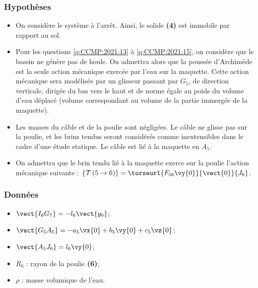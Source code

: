  
\subsubsection*{Hypothèses}
\begin{itemize}
\item On considère le système à l’arrêt. Ainsi, le solide \textbf{(4)} est immobile par rapport au sol.
\item Pour les questions \ref{q:CCMP:2021:13} à \ref{q:CCMP:2021:15}, on considère que le bassin ne génère pas de houle. On admettra alors que la poussée d’Archimède est la seule action mécanique exercée par l’eau sur la maquette. Cette action mécanique sera modélisée par un glisseur passant par $G_5$, de direction verticale, dirigée du bas vers le haut et de norme égale au poids du volume d’eau déplacé (volume correspondant au volume de la partie immergée de la maquette).
\item Les masses du câble et de la poulie sont négligées. Le câble ne glisse pas sur la poulie, et les brins tendus seront considérés comme inextensibles dans le cadre d’une étude statique. Le câble est lié à la maquette en $A_5$.
\item On admettra que le brin tendu lié à la maquette exerce sur la poulie l’action mécanique suivante :
$\left\{ \mathcal{T} \left(5\to 6 \right) \right\} = \torseurl{F_{56}\vy{0}}{\vect{0}}{J_6}$.
\end{itemize}


\subsubsection*{Données}
\begin{itemize}
    \item $\vect{I_6 G_7}  = -l_6 \vect{y_0}$;
    \item $\vect{G_5 A_5} = -a_5\vx{0}+b_5 \vy{0}+c_5 \vz{0}$;
    \item $\vect{A_5 J_6 } = l_6 \vy{0}$;
    \item $R_6$ : rayon de la poulie \textbf{(6)};
    \item $\rho$ : masse volumique de l’eau.
\end{itemize} 


\ifprof
\begin{corrige}
\end{corrige}
\else
\fi


